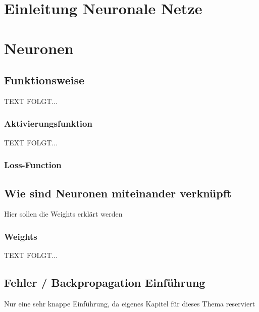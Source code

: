\newpage
\thispagestyle{empty}
\section{Einleitung Neuronale Netze}\label{sec:einleitung_nn}   

\vspace{1cm}




\newpage  
\section{Neuronen}\label{sec:neuronen}
  
\newpage
\subsection{Funktionsweise}\label{subsec:neuronen:funktionsweise}
  TEXT FOLGT... 
 

\newpage
\subsubsection{Aktivierungsfunktion}\label{subsec:neuronen:aktivierungsfunktion}
  
  TEXT FOLGT... 


\newpage


\subsubsection{Loss-Function}

\newpage 
\subsection{Wie sind Neuronen miteinander verknüpft}\label{subsec:neuronen:verknuepfung_neuronen}  
%
Hier sollen die Weights erklärt werden

\subsubsection{Weights}\label{Weights}
  TEXT FOLGT... 

\subsection{Fehler / Backpropagation Einführung}\label{subsec:neuronen:fehler_backpropagation}
Nur eine sehr knappe Einführung, da eigenes Kapitel für dieses Thema reserviert

